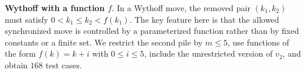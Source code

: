 \documentclass[review]{elsarticle}
\newcommand{\set}[1]{\{ #1 \}}
\newcommand{\tuple}[1]{\langle {#1} \rangle}
\newcommand{\true}{\top}
\newcommand{\statevar}{\mathcal{X}}
\newcommand{\act}{\mathcal{A}}
\newcommand{\constraint}{\mathcal{C}}
\newcommand{\estate}{\mathcal{E}}
\newcommand{\pre}{\mathtt{pre}}
\newcommand{\eff}{\mathtt{eff}}
\begin{document}
{\color{red}\textbf{Wythoff with a function $f$}. In a Wythoff move, the removed pair $(k_1,k_2)$ must satisfy $0 < k_1 \le k_2 < f(k_1)$.}
{\color{red}The key feature here is that the allowed synchronized move is controlled by a parameterized function rather than by fixed constants or a finite set.}
{\color{red}We restrict the second pile by $m \le 5$, use functions of the form $f(k)=k+i$ with $0 \le i \le 5$, include the unrestricted version of $v_2$, and obtain $168$ test cases.}
\end{document}
